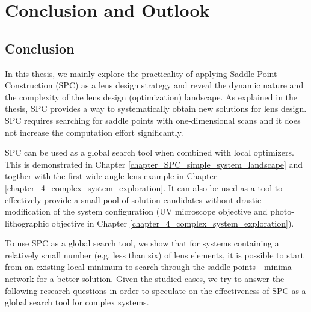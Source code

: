 \chapter{Conclusion and Outlook} %
\label{chapter_Conclusion} %
\graphicspath{ {./chapter-6/figures/} }  %
\captionsetup[figure]{labelfont=bf}
\captionsetup{margin=1.5em}
\captionsetup[table]{labelfont=bf}


\begin{comment}


\epigraph[0pt]{
Nel mezzo del cammin di nostra vita
mi ritrovai per una selva oscura,
che la diritta via era smarrita.

In the midst of life's journey
I found myself in a dark wood
where the right path was lost.

}{First stanza of Dante's Inferno}

\end{comment}
\section{Conclusion}
In this thesis, we mainly explore the practicality of applying  Saddle Point Construction (SPC) as a lens design strategy and reveal the dynamic nature and the complexity of the lens design (optimization) landscape.  As explained in the thesis, SPC provides a way to systematically obtain new solutions for lens design. SPC requires searching for saddle points with one-dimensional scans and it does not increase the computation effort significantly. 

SPC can be used as a global search tool when combined with local optimizers. This is demonstrated in Chapter \ref{chapter_SPC_simple_system_landscape} and togther with the first wide-angle lens example in Chapter \ref{chapter_4_complex_system_exploration}. It can also be used as a tool to effectively provide a small pool of solution candidates without drastic modification of the system configuration (UV microscope objective and photo-lithographic objective in Chapter \ref{chapter_4_complex_system_exploration}). 

To use SPC as a global search tool, we show that for systems containing a relatively small number (e.g. less than six) of lens elements, it is possible to start from an existing local minimum to search through the saddle points - minima network for a better solution. Given the studied cases, we try to answer the following research questions in order to speculate on the effectiveness of SPC as a global search tool for complex systems. 

